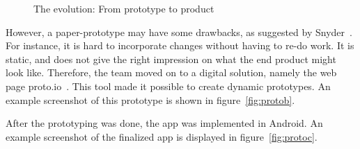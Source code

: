 \begin{figure}[H]
  \centering
\quad
\quad
\caption{The evolution: From prototype to product}
\end{figure}

\noindent However, a paper-prototype may have some drawbacks, as suggested by Snyder~\cite{paperprototype}. For instance, it is hard to incorporate changes without having to re-do work. It is static, and does not give the right impression on what the end product might look like. Therefore, the team moved on to a digital solution, namely the web page proto.io~\cite{protoio}. This tool made it possible to create dynamic prototypes. An example screenshot of this prototype is shown in figure~\ref{fig:protob}.

After the prototyping was done, the app was implemented in Android. An example screenshot of the finalized app is displayed in figure~\ref{fig:protoc}.
